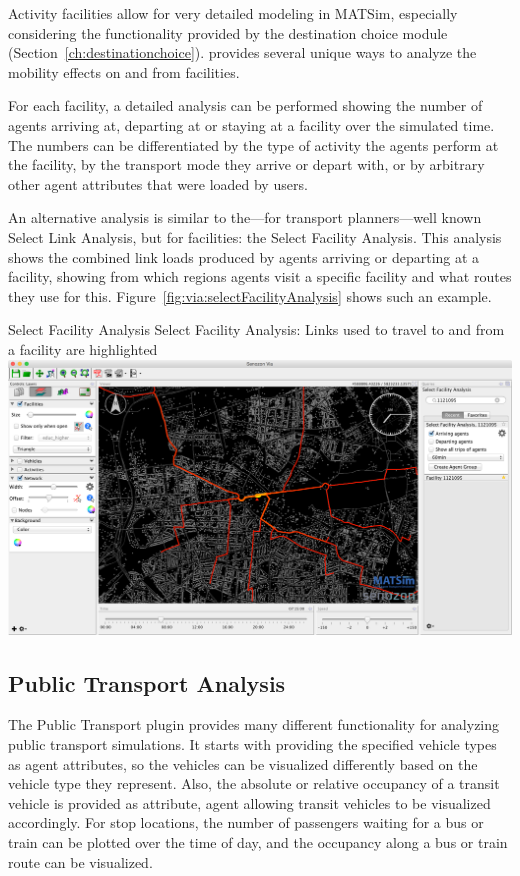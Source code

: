 Activity facilities allow for very detailed modeling in MATSim, especially
considering the functionality provided by the destination choice module
(Section~\ref{ch:destinationchoice}). \Via{} provides several unique ways to
analyze the mobility effects on and from facilities.

For each facility, a detailed analysis can be performed showing the number of
agents arriving at, departing at or staying at a facility over the simulated
time. The numbers can be differentiated by the type of activity the agents
perform at the facility, by the transport mode they arrive or depart with, or by
arbitrary other agent attributes that were loaded by users.

An alternative analysis is similar to the---for transport planners---well known
Select Link Analysis, but for facilities: the Select Facility Analysis. This
analysis shows the combined link loads produced by agents arriving or departing
at a facility, showing from which regions agents visit a specific facility and
what routes they use for this. Figure~\ref{fig:via:selectFacilityAnalysis} shows
such an example.


\createfigure%
{Select Facility Analysis}%
{Select Facility Analysis: Links used to travel to and from a facility are highlighted}%
{\label{fig:via:selectFacilityAnalysis}}%
{\includegraphics[width=1.\textwidth,angle=0]{./extending/figures/via/selectFacilityAnalysis}}%
{}

\subsection{Public Transport Analysis}

The Public Transport plugin provides many different functionality for analyzing
public transport simulations. It starts with providing the specified vehicle
types as agent attributes, so the vehicles can be visualized differently based
on the vehicle type they represent. Also, the absolute or relative
occupancy of a transit vehicle is provided as attribute, agent allowing transit
vehicles to be visualized accordingly. For stop locations, the number of
passengers waiting for a bus or train can be plotted over the time of day, and
the occupancy along a bus or train route can be visualized.

